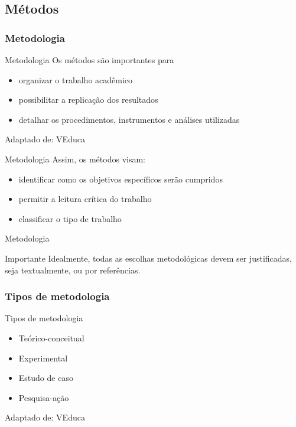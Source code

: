 \documentclass{beamer}
\begin{document}
\subsection{Métodos}

\subsubsection{Metodologia}

\begin{frame}{Metodologia}
  \footnotesize
  Os métodos são importantes para
  \bigskip
  \begin{itemize}
    \footnotesize
  \item organizar o trabalho acadêmico
    \bigskip
  \item possibilitar a replicação dos resultados
    \bigskip
  \item detalhar os procedimentos, instrumentos e análises utilizadas
  \end{itemize}

  \vfill
  \scriptsize
  Adaptado de: VEduca
\end{frame}

\begin{frame}{Metodologia}
  \footnotesize
  Assim, os métodos visam:
  \bigskip
  \begin{itemize}
    \footnotesize
  \item identificar como os objetivos específicos serão cumpridos
    \bigskip
  \item permitir a leitura crítica do trabalho
    \bigskip
  \item classificar o tipo de trabalho
  \end{itemize}
\end{frame}

\begin{frame}{Metodologia}
  \begin{block}{Importante}
    \footnotesize
    Idealmente, todas as escolhas metodológicas devem ser
    justificadas, seja textualmente, ou por referências.
  \end{block}
\end{frame}

\subsubsection{Tipos de metodologia}

\begin{frame}{Tipos de metodologia}
  \begin{itemize}
    \footnotesize
  \item<1-> Teórico-conceitual
  \bigskip
  \item<1-> Experimental
  \bigskip
  \item<1-> Estudo de caso
  \bigskip
  \item<1-> Pesquisa-ação
  \end{itemize}

  \vfill
  \scriptsize
  Adaptado de: VEduca
\end{frame}
\end{document}
